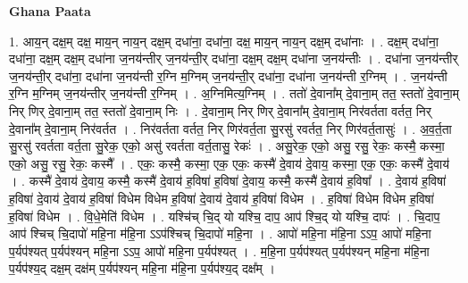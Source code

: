 \documentclass[17pt]{extarticle}
\begin{document}
\textbf{Ghana Paata } \newline

1. आय॒न् दक्ष॒म् दक्ष॒ माय॒न् नाय॒न् दक्ष॒म् दधा॑ना॒ दधा॑ना॒ दक्ष॒ माय॒न् नाय॒न् दक्ष॒म् दधा॑नाः । . दक्ष॒म् दधा॑ना॒ दधा॑ना॒ दक्ष॒म् दक्ष॒म् दधा॑ना ज॒नय॑न्तीर् ज॒नय॑न्ती॒र् दधा॑ना॒ दक्ष॒म् दक्ष॒म् दधा॑ना ज॒नय॑न्तीः । . दधा॑ना ज॒नय॑न्तीर् ज॒नय॑न्ती॒र् दधा॑ना॒ दधा॑ना ज॒नय॑न्ती र॒ग्नि म॒ग्निम् ज॒नय॑न्ती॒र् दधा॑ना॒ दधा॑ना ज॒नय॑न्ती र॒ग्निम् । . ज॒नय॑न्ती र॒ग्नि म॒ग्निम् ज॒नय॑न्तीर् ज॒नय॑न्ती र॒ग्निम् । . अ॒ग्निमित्य॒ग्निम् । . ततो॑ दे॒वाना᳚म् दे॒वाना॒म् तत॒ स्ततो॑ दे॒वाना॒म् निर् णिर् दे॒वाना॒म् तत॒ स्ततो॑ दे॒वाना॒म् निः । . दे॒वाना॒म् निर् णिर् दे॒वाना᳚म् दे॒वाना॒म् निर॑वर्तता वर्तत॒ निर् दे॒वाना᳚म् दे॒वाना॒म् निर॑वर्तत । . निर॑वर्तता वर्तत॒ निर् णिर॑वर्त॒ता सु॒रसु॑ रवर्तत॒ निर् णिर॑वर्त॒तासुः॑ । . अ॒व॒र्त॒ता सु॒रसु॑ रवर्तता वर्त॒ता सु॒रेक॒ एको॒ असु॑ रवर्तता वर्त॒तासु॒ रेकः॑ । . असु॒रेक॒ एको॒ असु॒ रसु॒ रेकः॒ कस्मै॒ कस्मा॒ एको॒ असु॒ रसु॒ रेकः॒ कस्मै᳚ । . एकः॒ कस्मै॒ कस्मा॒ एक॒ एकः॒ कस्मै॑ दे॒वाय॑ दे॒वाय॒ कस्मा॒ एक॒ एकः॒ कस्मै॑ दे॒वाय॑ । . कस्मै॑ दे॒वाय॑ दे॒वाय॒ कस्मै॒ कस्मै॑ दे॒वाय॑ ह॒विषा॑ ह॒विषा॑ दे॒वाय॒ कस्मै॒ कस्मै॑ दे॒वाय॑ ह॒विषा᳚ । . दे॒वाय॑ ह॒विषा॑ ह॒विषा॑ दे॒वाय॑ दे॒वाय॑ ह॒विषा॑ विधेम विधेम ह॒विषा॑ दे॒वाय॑ दे॒वाय॑ ह॒विषा॑ विधेम । . ह॒विषा॑ विधेम विधेम ह॒विषा॑ ह॒विषा॑ विधेम । . वि॒धे॒मेति॑ विधेम । . यश्चि॑च् चि॒द् यो यश्चि॒ दाप॒ आप॑ श्चि॒द् यो यश्चि॒ दापः॑ । . चि॒दाप॒ आप॑ श्चिच् चि॒दापो॑ महि॒ना म॑हि॒ना ऽऽप॑श्चिच् चि॒दापो॑ महि॒ना । . आपो॑ महि॒ना म॑हि॒ना ऽऽप॒ आपो॑ महि॒ना प॒र्यप॑श्यत् प॒र्यप॑श्यन् महि॒ना ऽऽप॒ आपो॑ महि॒ना प॒र्यप॑श्यत् । . म॒हि॒ना प॒र्यप॑श्यत् प॒र्यप॑श्यन् महि॒ना म॑हि॒ना प॒र्यप॑श्य॒द् दक्ष॒म् दक्ष॑म् प॒र्यप॑श्यन् महि॒ना म॑हि॒ना प॒र्यप॑श्य॒द् दक्ष᳚म् । \newline
\end{document}
